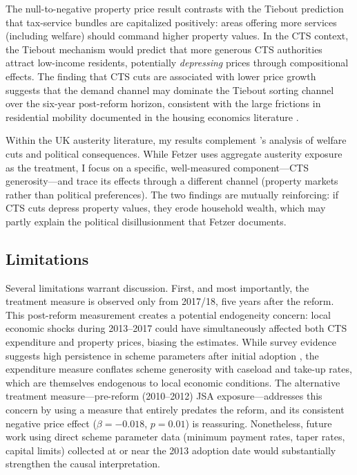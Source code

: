 \documentclass[12pt]{article}
\begin{document}
The null-to-negative property price result contrasts with the Tiebout \citep{tiebout1956} prediction that tax-service bundles are capitalized positively: areas offering more services (including welfare) should command higher property values. In the CTS context, the Tiebout mechanism would predict that more generous CTS authorities attract low-income residents, potentially \textit{depressing} prices through compositional effects. The finding that CTS cuts are associated with lower price growth suggests that the demand channel may dominate the Tiebout sorting channel over the six-year post-reform horizon, consistent with the large frictions in residential mobility documented in the housing economics literature \citep{duranton2020}.

Within the UK austerity literature, my results complement \citet{fetzer2019}'s analysis of welfare cuts and political consequences. While Fetzer uses aggregate austerity exposure as the treatment, I focus on a specific, well-measured component---CTS generosity---and trace its effects through a different channel (property markets rather than political preferences). The two findings are mutually reinforcing: if CTS cuts depress property values, they erode household wealth, which may partly explain the political disillusionment that Fetzer documents.

\subsection{Limitations}

Several limitations warrant discussion. First, and most importantly, the treatment measure is observed only from 2017/18, five years after the reform. This post-reform measurement creates a potential endogeneity concern: local economic shocks during 2013--2017 could have simultaneously affected both CTS expenditure and property prices, biasing the estimates. While survey evidence suggests high persistence in scheme parameters after initial adoption \citep{adam2017}, the expenditure measure conflates scheme generosity with caseload and take-up rates, which are themselves endogenous to local economic conditions. The alternative treatment measure---pre-reform (2010--2012) JSA exposure---addresses this concern by using a measure that entirely predates the reform, and its consistent negative price effect ($\beta = -0.018$, $p = 0.01$) is reassuring. Nonetheless, future work using direct scheme parameter data (minimum payment rates, taper rates, capital limits) collected at or near the 2013 adoption date would substantially strengthen the causal interpretation.
\end{document}
